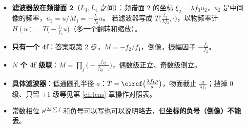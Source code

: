 \begin{warn}[变式]
\begin{itemize}
\item \textbf{滤波器放在频谱面 2}（$L_3,L_4$ 之间）：频谱面 2 的坐标 $\xi_2=\lambda f_3u_2$，$u_2$ 是中间像的频率，$u_2=u/M_1=-\frac{f_1}{f_2}u$。
若滤波器写成 $T\big(\frac{\xi_2}{\lambda f_3},\cdot\big)$，以物频率计 $H(u)=T\big(-\frac{f_1}{f_2}u\big)$（多一个翻转和缩放）。
\item \textbf{只有一个 4f}：答案取第 2 步，$M=-f_2/f_1$，倒像，振幅因子 $-\frac{f_1}{f_2}$。
\item \textbf{$N$ 个 4f 级联}：$M=\prod_j\big(-\frac{f_{2j}}{f_{2j-1}}\big)$，偶数级正立、奇数级倒立。
\item \textbf{具体滤波器}：低通圆孔半径 $a$：$T=\circf\big(\frac{\lambda f_1\rho}{a}\big)$，物面截止 $\frac{a}{\lambda f_1}$；挡掉 0 级、只留 $\pm1$ 级等见第 \ref{ch:lens} 章操作对照表。
\item 常数相位 $\ee^{i2k\sum f}$ 和负号可以写也可以说明略去，但\textbf{坐标的负号（倒像）不能丢}。
\end{itemize}
\end{warn}

